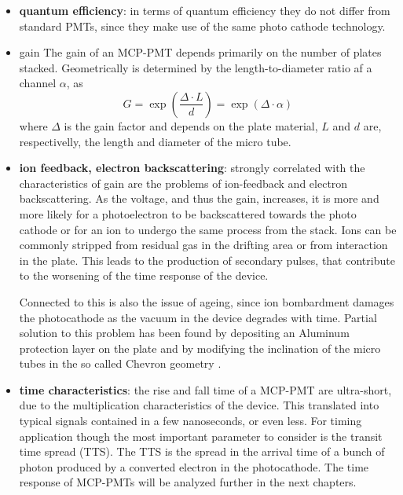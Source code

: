 \begin{itemize}
\item \textbf{quantum efficiency}: in terms of quantum efficiency they do not differ from standard PMTs, since they make use of the same photo cathode technology.
\item gain
The gain of an MCP-PMT depends primarily on the number of plates stacked. Geometrically is determined by the length-to-diameter ratio af a channel $\alpha$, as
\begin{equation}
G = \exp{\left( \frac{\Delta \cdot L}{d} \right)} = \exp{\left( \Delta \cdot \alpha \right)}
\end{equation}
where $\Delta$ is the gain factor and depends on the plate material, $L$ and $d$ are, respectivelly, the length and diameter of the micro tube.
\item \textbf{ion feedback, electron backscattering}: strongly correlated with the characteristics of gain are the problems of ion-feedback and electron backscattering. As the voltage, and thus the gain, increases, it is more and more likely for a photoelectron to be backscattered towards the photo cathode or for an ion to undergo the same process from the stack. Ions can be commonly stripped from residual gas in the drifting area or from interaction in the plate.
This leads to the production of secondary pulses, that contribute to the worsening of the time response of the device.

Connected to this is also the issue of ageing, since ion bombardment damages the photocathode as the vacuum in the device degrades with time.
Partial solution to this problem has been found by depositing an Aluminum protection layer on the plate and by modifying the inclination of the micro tubes in the so called Chevron geometry \cite{Vavra2004}.

\item \textbf{time characteristics}: the rise and fall time of a MCP-PMT are ultra-short, due to the multiplication characteristics of the device. This translated into typical signals contained in a few nanoseconds, or even less. For timing application though the most important parameter to consider is the transit time spread (TTS). The TTS is the spread in the arrival time of a bunch of photon produced by a converted electron in the photocathode. The time response of MCP-PMTs will be analyzed further in the next chapters.

\end{itemize}

